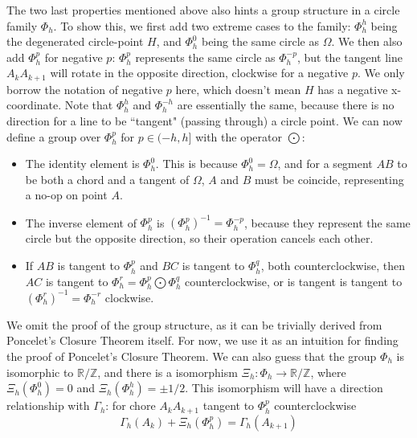 \documentclass[]{article}
\begin{document}
The two last properties mentioned above also hints a group structure in a circle family $\Phi_{h}$. To show this, we first add two extreme cases to the family: $\Phi_h^h$ being the degenerated circle-point $H$, and $\Phi_h^0$ being the same circle as $\Omega$. We then also add $\Phi_h^p$ for negative $p$: $\Phi_h^p$ represents the same circle as $\Phi_h^{-p}$, but the tangent line $A_k A_{k+1}$ will rotate in the opposite direction, clockwise for a negative $p$. We only borrow the notation of negative $p$ here, which doesn't mean $H$ has a negative x-coordinate.
Note that $\Phi_h^h$ and $\Phi_h^{-h}$ are essentially the same, because there is no direction for a line to be ``tangent" (passing through) a circle point. We can now define a group over $\Phi_h^p$ for $p\in(-h,h]$ with the operator $\bigodot$:
\begin{itemize}
	\item The identity element is $\Phi_h^0$. This is because $\Phi_h^0 = \Omega$, and for a segment $AB$ to be both a chord and a tangent of $\Omega$, $A$ and $B$ must be coincide, representing a no-op on point $A$.
	\item The inverse element of $\Phi_h^p$ is $(\Phi_h^p)^{-1} = \Phi_h^{-p}$, because they represent the same circle but the opposite direction, so their operation cancels each other.
	\item If $AB$ is tangent to $\Phi_{h}^{p}$ and $BC$ is tangent to $\Phi_{h}^{q}$, both counterclockwise, then $AC$ is tangent to $\Phi_{h}^{r} = \Phi_{h}^{p} \bigodot \Phi_{h}^{q}$ counterclockwise, or is tangent is tangent to $(\Phi_{h}^{r})^{-1} = \Phi_{h}^{-r}$ clockwise.
\end{itemize}
We omit the proof of the group structure, as it can be trivially derived from Poncelet's Closure Theorem itself. For now, we use it as an intuition for finding the proof of Poncelet's Closure Theorem. We can also guess that the group $\Phi_h$ is isomorphic to $\mathbb{R}/\mathbb{Z}$, and there is a isomorphism $\Xi_h:  \Phi_h \to \mathbb{R}/\mathbb{Z}$, where $\Xi_h(\Phi_h^0) = 0$ and $\Xi_h(\Phi_h^h) = \pm 1/2$. This isomorphism will have a direction relationship with $\Gamma_h$: for chore $A_k A_{k+1}$ tangent to $\Phi_h^p$ counterclockwise
\[
	\Gamma_h(A_k) + \Xi_h(\Phi_h^p) = \Gamma_h(A_{k+1})
\]
\end{document}
